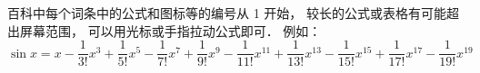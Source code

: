 
\begin{issues}
\issueDraft
\end{issues}

百科中每个词条中的公式和图标等的编号从 1 开始， 较长的公式或表格有可能超出屏幕范围， 可以用光标或手指拉动公式即可． 例如：
\begin{equation}
\sin x = x - \frac{1}{3!} x^3 + \frac{1}{5!} x^5 - \frac{1}{7!} x^7+\frac{1}{9!} x^9-\frac{1}{11!} x^11+\frac{1}{13!} x^13-\frac{1}{15!} x^15+\frac{1}{17!} x^17-\frac{1}{19!} x^19
\end{equation}